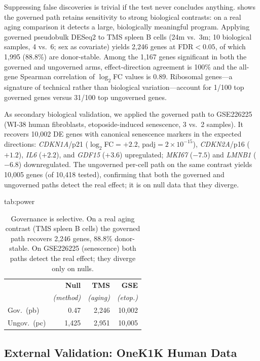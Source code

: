 \documentclass[pmlr,twocolumn,10pt]{jmlr}
\begin{document}
Suppressing false discoveries is trivial if the test never concludes anything.
 shows the governed path retains sensitivity to strong
biological contrasts: on a real aging comparison it detects a large, biologically
meaningful program. Applying governed pseudobulk DESeq2 to TMS spleen B cells
(24m vs.\ 3m; 10 biological samples, 4 vs.\ 6; sex as covariate) yields
2{,}246 genes at FDR${<}0.05$, of which 1{,}995 (88.8\%) are
donor-stable. Among the 1{,}167 genes significant in both the governed and
ungoverned arms, effect-direction agreement is 100\% and the all-gene Spearman
correlation of $\log_2$FC values is 0.89. Ribosomal genes---a signature of
technical rather than biological variation---account for 1/100 top governed genes
versus 31/100 top ungoverned genes.

As secondary biological validation, we applied the governed path to GSE226225
(WI-38 human fibroblasts, etoposide-induced senescence, 3 vs.\ 2 samples). It
recovers 10{,}002 DE genes with canonical senescence markers in the expected
directions: \textit{CDKN1A}/p21 ($\log_2$FC${=}{+}2.2$,
padj${=}2{\times}10^{-15}$), \textit{CDKN2A}/p16 (${+}1.2$), \textit{IL6}
(${+}2.2$), and \textit{GDF15} (${+}3.6$) upregulated; \textit{MKI67}
(${-}7.5$) and \textit{LMNB1} (${-}6.8$) downregulated. The ungoverned per-cell
path on the same contrast yields 10{,}005 genes (of 10{,}418 tested), confirming
that both the governed and ungoverned paths detect the real effect; it is on null
data that they diverge.

\begin{table}[htbp]
\floatconts
  {tab:power}
  {\caption{Governance is selective. On a real aging contrast (TMS spleen B
  cells) the governed path recovers 2{,}246 genes, 88.8\% donor-stable. On
  GSE226225 (senescence) both paths detect the real effect; they diverge only
  on nulls.}}
  {\footnotesize
  \begin{tabular}{@{}lrrr@{}}
  \toprule
  & \textbf{Null} & \textbf{TMS} & \textbf{GSE} \\
  & \textit{(method)} & \textit{(aging)} & \textit{(etop.)} \\
  \midrule
  Gov.\ (pb) & 0.47 & 2{,}246 & 10{,}002 \\
  Ungov.\ (pc) & 1{,}425 & 2{,}951 & 10{,}005 \\
  \bottomrule
  \end{tabular}}
\end{table}

\subsection{External Validation: OneK1K Human Data}
\label{sec:onek1k}
\end{document}
